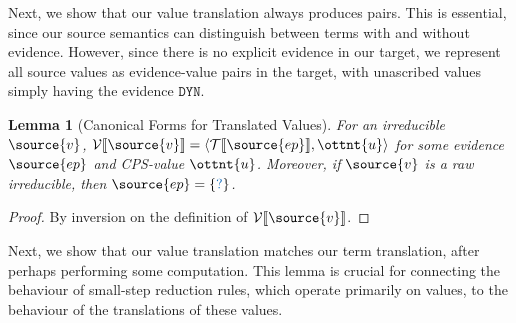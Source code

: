 \documentclass[11pt]{article}
\newcommand{\blue}[1]{ {\color{RoyalBlue}{{#1}}} }
\newtheorem{lemma}{Lemma}[section]
\begin{document}
Next, we show that our value translation always produces pairs. This is essential, since our source semantics
can distinguish between terms with and without evidence. However, since there is no explicit evidence in our target,
we represent all source values as evidence-value pairs in the target, with unascribed values simply
having the evidence $ \mathtt{ DYN } $.  

\begin{lemma}[Canonical Forms for Translated Values]
	\label{lem:canonical-trans}
	For an irreducible $\source{v}$, $ \mathcal{V}\llbracket  \source{v}  \rrbracket =   \langle   \mathcal{T}\llbracket  \source{ep}  \rrbracket  ,  \ottnt{u} \rangle   $ for some evidence $\source{ep}$ and CPS-value $\ottnt{u}$.
	Moreover, if $\source{v}$ is a raw irreducible, then $\source{ep}= \{   \blue{?}   \} $.
\end{lemma}
\begin{proof}
	By inversion on the definition of $ \mathcal{V}\llbracket  \source{v}  \rrbracket $.
\end{proof}

Next, we show that our value translation matches our term translation, after perhaps performing
some computation. This lemma is crucial for connecting the behaviour of small-step reduction rules,
which operate primarily on values, to the behaviour of the translations of these values.
\end{document}
